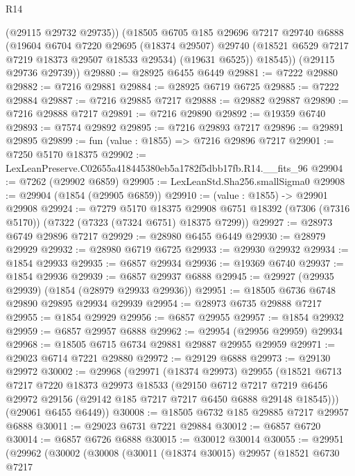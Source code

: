 \begin{lexlean}{R14}
\begin{coremodule}
          (@29115 @29732 @29735))
        (@18505
          @6705
          @185
          @29696
          @7217
          @29740
          @6888
          (@19604
            @6704
            @7220
            @29695
            (@18374 @29507)
            @29740
            (@18521 @6529 @7217 @7219 @18373 @29507 @18533 @29534)
            (@19631 @6525))
          @18545))
      (@29115 @29736 @29739))
@29880 := @28925 @6455 @6449
@29881 := @7222 @29880
@29882 := @7216 @29881
@29884 := @28925 @6719 @6725
@29885 := @7222 @29884
@29887 := @7216 @29885 @7217
@29888 := @29882 @29887
@29890 := @7216 @29888 @7217
@29891 := @7216 @29890
@29892 := @19359 @6740
@29893 := @7574 @29892
@29895 := @7216 @29893 @7217
@29896 := @29891 @29895
@29899 := fun (value : @1855) => @7216 @29896 @7217
@29901 := @7250 @5170 @18375
@29902 := LexLeanPreserve.C02655a418445380eb5a1782f5dbb17fb.R14.__fits_96
@29904 := @7262 (@29902 @6859)
@29905 := LexLeanStd.Sha256.smallSigma0
@29908 := @29904 (@1854 (@29905 @6859))
@29910 := (value : @1855) -> @29901 @29908
@29924 := @7279
    @5170
    @18375
    @29908
    @6751
    @18392
    (@7306 (@7316 @5170))
    (@7322 (@7323 (@7324 @6751) @18375 @7299))
@29927 := @28973 @6749 @29896 @7217
@29929 := @28980 @6455 @6449
@29930 := @28979 @29929
@29932 := @28980 @6719 @6725
@29933 := @29930 @29932
@29934 := @1854 @29933
@29935 := @6857 @29934
@29936 := @19369 @6740
@29937 := @1854 @29936
@29939 := @6857 @29937 @6888
@29945 := @29927 (@29935 @29939) (@1854 (@28979 @29933 @29936))
@29951 := @18505 @6736 @6748 @29890 @29895 @29934 @29939
@29954 := @28973 @6735 @29888 @7217
@29955 := @1854 @29929
@29956 := @6857 @29955
@29957 := @1854 @29932
@29959 := @6857 @29957 @6888
@29962 := @29954 (@29956 @29959) @29934
@29968 := @18505 @6715 @6734 @29881 @29887 @29955 @29959
@29971 := @29023 @6714 @7221 @29880
@29972 := @29129 @6888
@29973 := @29130 @29972
@30002 := @29968
    (@29971
      (@18374 @29973)
      @29955
      (@18521
        @6713
        @7217
        @7220
        @18373
        @29973
        @18533
        (@29150
          @6712
          @7217
          @7219
          @6456
          @29972
          @29156
          (@29142 @185 @7217 @7217 @6450 @6888 @29148 @18545)))
      (@29061 @6455 @6449))
@30008 := @18505 @6732 @185 @29885 @7217 @29957 @6888
@30011 := @29023 @6731 @7221 @29884
@30012 := @6857 @6720
@30014 := @6857 @6726 @6888
@30015 := @30012 @30014
@30055 := @29951
    (@29962
      (@30002
        (@30008
          (@30011
            (@18374 @30015)
            @29957
            (@18521
              @6730
              @7217

\end{coremodule}
\end{lexlean}
